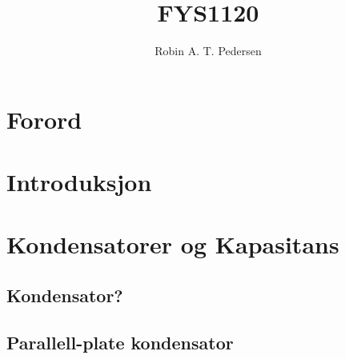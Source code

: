 \documentclass{article}
\begin{document}
  \title{FYS1120}
  \author{Robin A. T. Pedersen}
  \maketitle
  \tableofcontents

  \section{Forord}
    
  \section{Introduksjon}
    
  \section{Kondensatorer og Kapasitans}
    \subsection{Kondensator?}
      
    \subsection{Parallell-plate kondensator}
      
\end{document}
